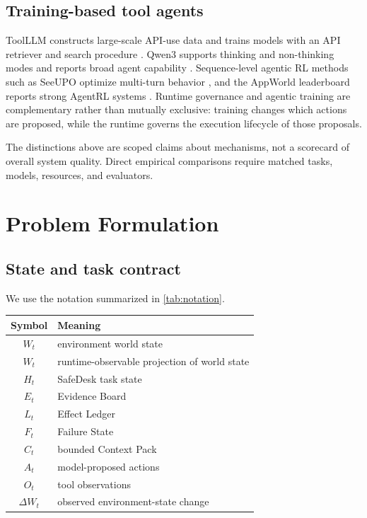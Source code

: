 \documentclass[10pt]{article}
\newcommand{\safedesk}{SafeDesk}
\begin{document}
\subsection{Training-based tool agents}

ToolLLM constructs large-scale API-use data and trains models with an API retriever
and search procedure \citep{qin2023toolllm}. Qwen3 supports thinking and
non-thinking modes and reports broad agent capability \citep{yang2025qwen3}.
Sequence-level agentic RL methods such as SeeUPO optimize multi-turn behavior
\citep{hu2026seeupo}, and the AppWorld leaderboard reports strong AgentRL systems
\citep{appworldleaderboard2026}. Runtime governance and agentic training are
complementary rather than mutually exclusive: training changes which actions are
proposed, while the runtime governs the execution lifecycle of those proposals.

The distinctions above are scoped claims about mechanisms, not a scorecard of
overall system quality. Direct empirical comparisons require matched tasks,
models, resources, and evaluators.

\section{Problem Formulation}

\subsection{State and task contract}

We use the notation summarized in \cref{tab:notation}.
\begin{center}
\begin{minipage}{0.82\linewidth}
\centering
{}
\label{tab:notation}
\small
\begin{tabular}{@{}cl@{}}
\toprule
Symbol & Meaning \\
\midrule
$W_t$ & environment world state \\
$\widehat{W}_t$ & runtime-observable projection of world state \\
$H_t$ & \safedesk{} task state \\
$E_t$ & Evidence Board \\
$L_t$ & Effect Ledger \\
$F_t$ & Failure State \\
$C_t$ & bounded Context Pack \\
$A_t$ & model-proposed actions \\
$O_t$ & tool observations \\
$\Delta W_t$ & observed environment-state change \\
\bottomrule
\end{tabular}
\end{minipage}
\end{center}
\end{document}
